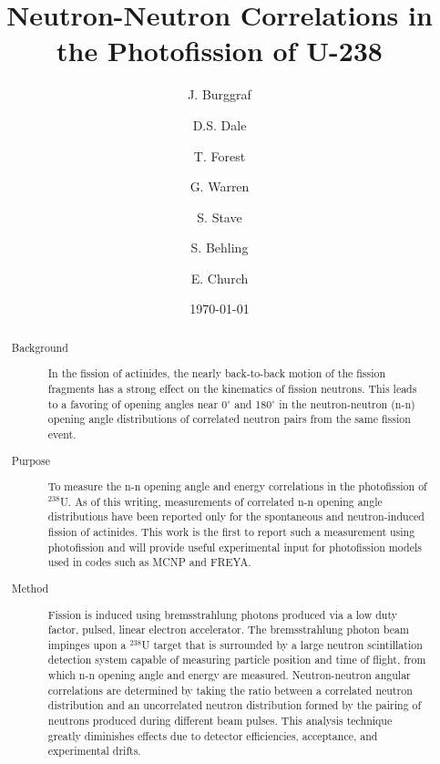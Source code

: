 \documentclass[%
 reprint,
 calc,
 amsmath,amssymb,
 aps,
 nofootinbib,
 linenumbers
]{revtex4-1}
\begin{document}

\title{Neutron-Neutron Correlations in the Photofission of U-238
}


\author{J. Burggraf}
\author{D.S. Dale}
\author{T. Forest}

\author{G. Warren}
\author{S. Stave}
\author{S. Behling}
\author{E. Church}

\date{\today}
\begin{abstract}
    \begin{description}
        \item[Background] In the fission of actinides, the nearly back-to-back motion of the fission fragments has a strong effect on the kinematics of fission neutrons.
        This leads to a favoring of opening angles near 0$^{\circ}$ and 180$^{\circ}$ in the neutron-neutron (n-n) opening angle distributions of correlated neutron pairs from the same fission event.
        
        \item[Purpose] To measure the n-n opening angle and energy correlations in the photofission of $^{238}$U.
        As of this writing, measurements of correlated n-n opening angle distributions have been reported only for the spontaneous and neutron-induced fission of actinides.
        This work is the first to report such a measurement using photofission and will provide useful experimental input for photofission models used in codes such as MCNP and FREYA.

        \item[Method] Fission is induced using bremsstrahlung photons produced via a low duty factor, pulsed, linear electron accelerator.
        The bremsstrahlung photon beam impinges upon a $^{238}$U target that is surrounded by a large neutron scintillation detection system capable of measuring particle position and time of flight, from which n-n opening angle and energy are measured.
Neutron-neutron angular correlations are determined by taking the ratio between a correlated neutron distribution and an uncorrelated neutron distribution formed by the pairing of neutrons produced during different beam pulses.
        This analysis technique greatly diminishes effects due to detector efficiencies, acceptance, and experimental drifts.


\end{description}
\end{abstract}
\end{document}
